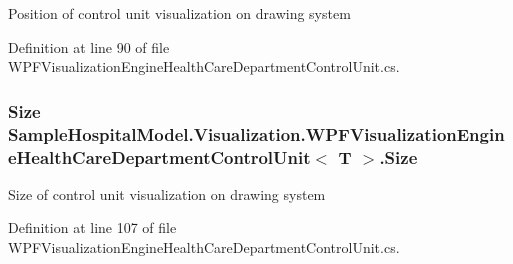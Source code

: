 Position of control unit visualization on drawing system 



Definition at line 90 of file W\+P\+F\+Visualization\+Engine\+Health\+Care\+Department\+Control\+Unit.\+cs.

\subsubsection[{\texorpdfstring{Size}{Size}}]{\setlength{\rightskip}{0pt plus 5cm}Size {\bf Sample\+Hospital\+Model.\+Visualization.\+W\+P\+F\+Visualization\+Engine\+Health\+Care\+Department\+Control\+Unit}$<$ T $>$.Size\hspace{0.3cm}{\ttfamily [get]}}\hypertarget{class_sample_hospital_model_1_1_visualization_1_1_w_p_f_visualization_engine_health_care_department_control_unit_abe4ba0d78d527ff6c4cdde7dd27943fc}{}\label{class_sample_hospital_model_1_1_visualization_1_1_w_p_f_visualization_engine_health_care_department_control_unit_abe4ba0d78d527ff6c4cdde7dd27943fc}


Size of control unit visualization on drawing system 



Definition at line 107 of file W\+P\+F\+Visualization\+Engine\+Health\+Care\+Department\+Control\+Unit.\+cs.

